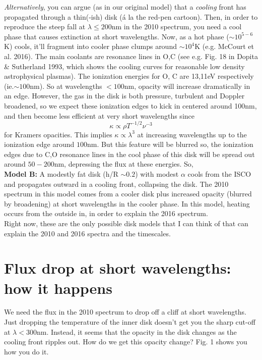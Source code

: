 \documentclass[12pt]{article}
\begin{document}
\emph{Alternatively}, you can argue (as in our original model) that a \emph{cooling} front has propagated through a thin(-ish) disk (\'{a} la the red-pen cartoon). Then, in order to reproduce the steep fall at $\lambda \leq 200$nm in the 2010 spectrum, you need a cool phase that causes extinction at short wavelengths. Now, as a hot phase ($\sim 10^{5-6}$K) cools, it'll fragment into cooler phase clumps around $\sim 10^{4}$K (e.g. McCourt et al. 2016). The main coolants are resonance lines in O,C (see e.g. Fig. 18 in Dopita \& Sutherland 1993, which shows the cooling curves for reasonable low density astrophysical plasmas). The ionization energies for O, C are 13,11eV respectively (ie.$\sim 100$nm). So at wavelengths $<100$nm, opacity will increase dramatically in an edge. However, the gas in the disk is both pressure, turbulent and Doppler broadened, so we expect these ionization edges to kick in centered around 100nm, and then become less efficient at very short wavelengths since
\begin{equation}
\kappa \propto \rho T^{-1/2} \nu^{-3}
\end{equation}
for Kramers opacities. This implies $\kappa \propto \lambda^{3}$ at increasing wavelengths up to the ionization edge around $100$nm. But this feature will be blurred so, the ionization edges due to C,O resonance lines in the cool phase of this disk will be spread out around $50-200$nm, depressing the flux at these energies. So,\\

\textbf{Model B:} A modestly fat disk (h/R $\sim 0.2$) with modest $\alpha$ cools from the ISCO and propagates outward in a cooling front, collapsing the disk. The 2010 spectrum in this model comes from a cooler disk plus increased opacity (blurred by broadening) at short wavelengths in the cooler phase. In this model, heating occurs from the outside in, in order to explain the 2016 spectrum.\\

Right now, these are the only possible disk models that I can think of that can explain the 2010 and 2016 spectra and the timescales.\\






\section{Flux drop at short wavelengths: how it happens}
We need the flux in the 2010 spectrum to drop off a cliff at short wavelengths. Just dropping the temperature of the inner disk doesn't get you the sharp cut-off at $\lambda<300$nm. Instead, it seems that the opacity in the disk changes as the cooling front ripples out. How do we get this opacity change? Fig. 1 shows you how you do it.\\
\end{document}
